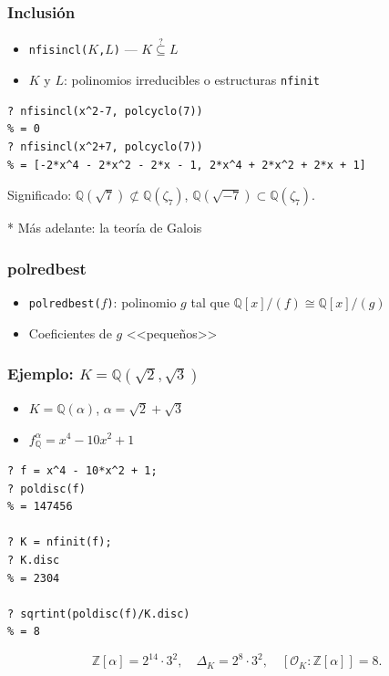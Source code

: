 \documentclass{beamer}
\newcommand{\ZZ}{\mathbb{Z}}
\newcommand{\QQ}{\mathbb{Q}}
\renewcommand{\O}{\mathcal{O}}
\begin{document}
\begin{frame}[fragile]
  \frametitle{Inclusión}
  \begin{itemize}
  \item \texttt{nfisincl($K$,$L$)} --- $K \stackrel{?}{\subseteq} L$
  \item $K$ y $L$: polinomios irreducibles o estructuras \texttt{nfinit}
  \end{itemize}

  \begin{shaded}\footnotesize
\begin{verbatim}
? nfisincl(x^2-7, polcyclo(7))
% = 0
? nfisincl(x^2+7, polcyclo(7))
% = [-2*x^4 - 2*x^2 - 2*x - 1, 2*x^4 + 2*x^2 + 2*x + 1]
\end{verbatim}
  \end{shaded}

  Significado: $\QQ (\sqrt{7}) \not\subset \QQ (\zeta_7)$,
  $\QQ (\sqrt{-7}) \subset \QQ (\zeta_7)$.

  \vspace{\fill}

  * Más adelante: la teoría de Galois
\end{frame}


\begin{frame}[fragile]
  \frametitle{polredbest}

  \begin{itemize}
  \item \texttt{polredbest($f$)}: polinomio $g$ tal que
    $\QQ[x]/(f) \cong \QQ[x]/(g)$

  \item Coeficientes de $g$ <<pequeños>>
  \end{itemize}
\end{frame}


\begin{frame}[fragile]
  \frametitle{Ejemplo: $K = \QQ (\sqrt{2},\sqrt{3})$}

  \begin{itemize}
  \item $K = \QQ (\alpha)$, $\alpha = \sqrt{2} + \sqrt{3}$

  \item $f^\alpha_\QQ = x^4 - 10 x^2 + 1$
  \end{itemize}

  \begin{shaded}\footnotesize
\begin{verbatim}
? f = x^4 - 10*x^2 + 1;
? poldisc(f)
% = 147456

? K = nfinit(f);
? K.disc 
% = 2304

? sqrtint(poldisc(f)/K.disc)
% = 8
\end{verbatim}
  \end{shaded}

  \[ \ZZ [\alpha] = 2^{14}\cdot 3^2, \quad
     \Delta_K = 2^8\cdot 3^2, \quad
     [\O_K : \ZZ [\alpha]] = 8. \]
\end{frame}
\end{document}
